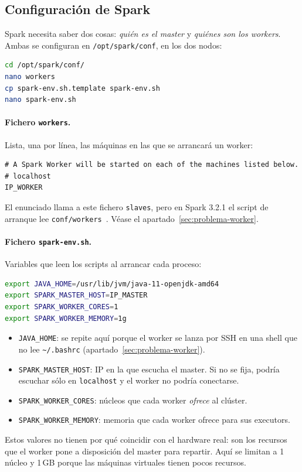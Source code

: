 \documentclass[11pt,a4paper]{article}
\begin{document}
\subsection{Configuración de Spark}

Spark necesita saber dos cosas: \emph{quién es el master} y \emph{quiénes son los workers}. Ambas se configuran en \texttt{/opt/spark/conf}, en los dos nodos:

\begin{lstlisting}[language=bash]
cd /opt/spark/conf/
nano workers
cp spark-env.sh.template spark-env.sh
nano spark-env.sh
\end{lstlisting}

\paragraph{Fichero \texttt{workers}.} Lista, una por línea, las máquinas en las que se arrancará un worker:
\begin{lstlisting}
# A Spark Worker will be started on each of the machines listed below.
# localhost
IP_WORKER
\end{lstlisting}

\begin{aviso}
El enunciado llama a este fichero \texttt{slaves}, pero en Spark 3.2.1 el script de arranque lee \texttt{conf/workers}~\cite{spark-standalone}. Véase el apartado~\ref{sec:problema-worker}.
\end{aviso}

\paragraph{Fichero \texttt{spark-env.sh}.} Variables que leen los scripts al arrancar cada proceso:
\begin{lstlisting}[language=bash]
export JAVA_HOME=/usr/lib/jvm/java-11-openjdk-amd64
export SPARK_MASTER_HOST=IP_MASTER
export SPARK_WORKER_CORES=1
export SPARK_WORKER_MEMORY=1g
\end{lstlisting}

\begin{itemize}
  \item \texttt{JAVA\_HOME}: se repite aquí porque el worker se lanza por SSH en una shell que no lee \texttt{\textasciitilde/.bashrc} (apartado~\ref{sec:problema-worker}).
  \item \texttt{SPARK\_MASTER\_HOST}: IP en la que escucha el master. Si no se fija, podría escuchar sólo en \texttt{localhost} y el worker no podría conectarse.
  \item \texttt{SPARK\_WORKER\_CORES}: núcleos que cada worker \emph{ofrece} al clúster.
  \item \texttt{SPARK\_WORKER\_MEMORY}: memoria que cada worker ofrece para sus executors.
\end{itemize}
Estos valores no tienen por qué coincidir con el hardware real: son los recursos que el worker pone a disposición del master para repartir. Aquí se limitan a 1 núcleo y 1\,GB porque las máquinas virtuales tienen pocos recursos.
\end{document}
